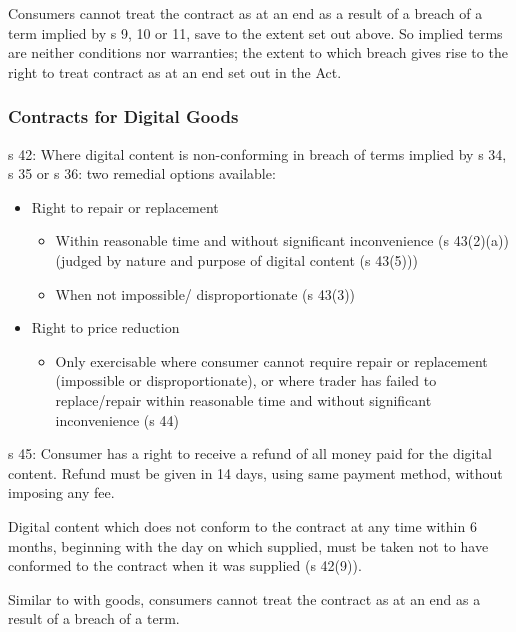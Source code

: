 \documentclass[
]{article}
\providecommand{\tightlist}{%
  \setlength{\itemsep}{0pt}\setlength{\parskip}{0pt}}
\begin{document}
Consumers cannot treat the contract as at an end as a result of a breach
of a term implied by s 9, 10 or 11, save to the extent set out above. So
implied terms are neither conditions nor warranties; the extent to which
breach gives rise to the right to treat contract as at an end set out in
the Act.

\hypertarget{contracts-for-digital-goods}{%
\subsubsection{Contracts for Digital
Goods}\label{contracts-for-digital-goods}}

s 42: Where digital content is non-conforming in breach of terms implied
by s 34, s 35 or s 36: two remedial options available:

\begin{itemize}
\tightlist
\item
  Right to repair or replacement

  \begin{itemize}
  \tightlist
  \item
    Within reasonable time and without significant inconvenience (s
    43(2)(a)) (judged by nature and purpose of digital content (s
    43(5)))
  \item
    When not impossible/ disproportionate (s 43(3))
  \end{itemize}
\item
  Right to price reduction

  \begin{itemize}
  \tightlist
  \item
    Only exercisable where consumer cannot require repair or replacement
    (impossible or disproportionate), or where trader has failed to
    replace/repair within reasonable time and without significant
    inconvenience (s 44)
  \end{itemize}
\end{itemize}

s 45: Consumer has a right to receive a refund of all money paid for the
digital content. Refund must be given in 14 days, using same payment
method, without imposing any fee.

Digital content which does not conform to the contract at any time
within 6 months, beginning with the day on which supplied, must be taken
not to have conformed to the contract when it was supplied (s 42(9)).

Similar to with goods, consumers cannot treat the contract as at an end
as a result of a breach of a term.
\end{document}
